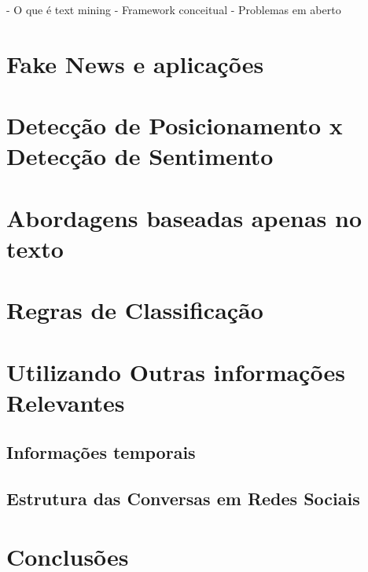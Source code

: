 - O que é text mining
- Framework conceitual
- Problemas em aberto

\section{Fake News e aplicações}

\section{Detecção de Posicionamento x Detecção de Sentimento}

\section{Abordagens baseadas apenas no texto}

\section{Regras de Classificação}

\section{Utilizando Outras informações Relevantes}

\subsection{Informações temporais}

\subsection{Estrutura das Conversas em Redes Sociais}

\section{Conclusões}
